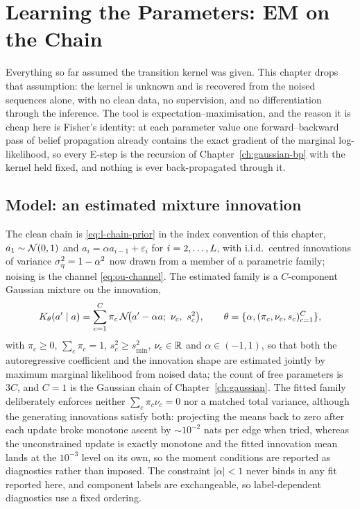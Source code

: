 
\chapter{Learning the Parameters: EM on the Chain}\label{ch:em-method}

Everything so far assumed the transition kernel was given. This chapter drops
that assumption: the kernel is unknown and is recovered from the noised
sequences alone, with no clean data, no supervision, and no differentiation
through the inference. The tool is expectation--maximisation, and the reason
it is cheap here is Fisher's identity: at each parameter value one
forward--backward pass of belief propagation already contains the exact
gradient of the marginal log-likelihood, so every E-step is the recursion of
Chapter~\ref{ch:gaussian-bp} with the kernel held fixed, and nothing is ever
back-propagated through it.

\section{Model: an estimated mixture innovation}\label{sec:em-model}

The clean chain is \eqref{eq:l-chain-prior} in the index convention of this
chapter, $a_1 \sim \mathcal{N}(0,1)$ and $a_i = \alpha a_{i-1} + \varepsilon_i$ for
$i = 2,\dots,L$, with i.i.d.\ centred innovations of variance
$\sigma_\eta^2 = 1-\alpha^2$ now drawn from a member of a parametric family; noising
is the channel \eqref{eq:ou-channel}. The estimated family is a
$C$-component Gaussian mixture on the innovation,
\begin{equation}
  K_\theta(a' \mid a) = \sum_{c=1}^{C} \pi_c \,
    \mathcal{N}\!\big(a' - \alpha a;\ \nu_c,\ s_c^2\big),
  \qquad \theta = \{\alpha, (\pi_c,\nu_c,s_c)_{c=1}^C\},
  \label{eq:em-mixture-kernel}
\end{equation}
with $\pi_c \ge 0$, $\sum_c\pi_c = 1$, $s_c^2 \ge s_{\min}^2$, $\nu_c \in \mathbb{R}$
and $\alpha \in (-1,1)$, so that both the autoregressive coefficient and the
innovation shape are estimated jointly by maximum marginal likelihood from
noised data; the count of free parameters is $3C$, and $C = 1$ is the Gaussian
chain of Chapter~\ref{ch:gaussian}. The fitted family deliberately enforces
neither $\sum_c\pi_c\nu_c = 0$ nor a matched total variance, although the
generating innovations satisfy both: projecting the means back to zero after
each update broke monotone ascent by $\sim 10^{-2}$ nats per edge when tried,
whereas the unconstrained update is exactly monotone and the fitted innovation
mean lands at the $10^{-3}$ level on its own, so the moment conditions are
reported as diagnostics rather than imposed. The constraint $|\alpha| < 1$
never binds in any fit reported here, and component labels are exchangeable,
so label-dependent diagnostics use a fixed ordering.


